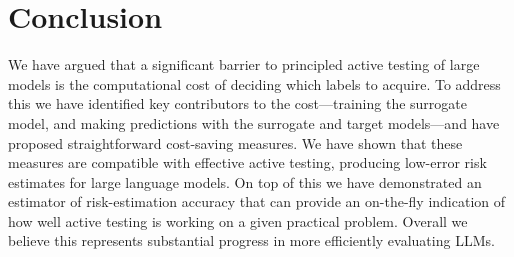 \section{Conclusion}

We have argued that a significant barrier to principled active testing of large models is the computational cost of deciding which labels to acquire.
To address this we have identified key contributors to the cost---training the surrogate model, and making predictions with the surrogate and target models---and have proposed straightforward cost-saving measures.
We have shown that these measures are compatible with effective active testing, producing low-error risk estimates for large language models.
On top of this we have demonstrated an estimator of risk-estimation accuracy that can provide an on-the-fly indication of how well active testing is working on a given practical problem.
Overall we believe this represents substantial progress in more efficiently evaluating LLMs.